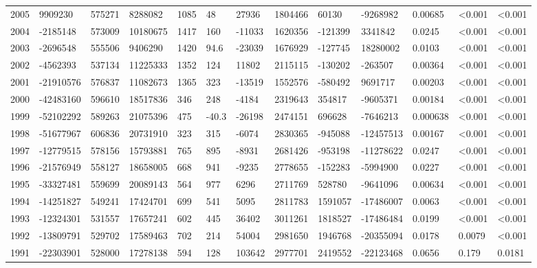 \documentclass{article}
\begin{document}
\begin{table}[H]
\begin{tabular}{rllllllllllll}
  2005 & 9909230 & 575271 & 8288082 & 1085 & 48 & 27936 & 1804466 & 60130 & -9268982 & 0.00685 & \textless 0.001 & \textless 0.001 \\
  2004 & -2185148 & 573009 & 10180675 & 1417 & 160 & -11033 & 1620356 & -121399 & 3341842 & 0.0245 & \textless 0.001 & \textless 0.001 \\
  2003 & -2696548 & 555506 & 9406290 & 1420 & 94.6 & -23039 & 1676929 & -127745 & 18280002 & 0.0103 & \textless 0.001 & \textless 0.001 \\
  2002 & -4562393 & 537134 & 11225333 & 1352 & 124 & 11802 & 2115115 & -130202 & -263507 & 0.00364 & \textless 0.001 & \textless 0.001 \\
  2001 & -21910576 & 576837 & 11082673 & 1365 & 323 & -13519 & 1552576 & -580492 & 9691717 & 0.00203 & \textless 0.001 & \textless 0.001 \\
  2000 & -42483160 & 596610 & 18517836 & 346 & 248 & -4184 & 2319643 & 354817 & -9605371 & 0.00184 & \textless 0.001 & \textless 0.001 \\
  1999 & -52102292 & 589263 & 21075396 & 475 & -40.3 & -26198 & 2474151 & 696628 & -7646213 & 0.000638 & \textless 0.001 & \textless 0.001 \\
  1998 & -51677967 & 606836 & 20731910 & 323 & 315 & -6074 & 2830365 & -945088 & -12457513 & 0.00167 & \textless 0.001 & \textless 0.001 \\
  1997 & -12779515 & 578156 & 15793881 & 765 & 895 & -8931 & 2681426 & -953198 & -11278622 & 0.0247 & \textless 0.001 & \textless 0.001 \\
  1996 & -21576949 & 558127 & 18658005 & 668 & 941 & -9235 & 2778655 & -152283 & -5994900 & 0.0227 & \textless 0.001 & \textless 0.001 \\
  1995 & -33327481 & 559699 & 20089143 & 564 & 977 & 6296 & 2711769 & 528780 & -9641096 & 0.00634 & \textless 0.001 & \textless 0.001 \\
  1994 & -14251827 & 549241 & 17424701 & 699 & 541 & 5095 & 2811783 & 1591057 & -17486007 & 0.0063 & \textless 0.001 & \textless 0.001 \\
  1993 & -12324301 & 531557 & 17657241 & 602 & 445 & 36402 & 3011261 & 1818527 & -17486484 & 0.0199 & \textless 0.001 & \textless 0.001 \\
  1992 & -13809791 & 529702 & 17589463 & 702 & 214 & 54004 & 2981650 & 1946768 & -20355094 & 0.0178 & 0.0079 & \textless 0.001 \\
  1991 & -22303901 & 528000 & 17278138 & 594 & 128 & 103642 & 2977701 & 2419552 & -22123468 & 0.0656 & 0.179 & 0.0181 \\

\end{tabular}
\end{table}
\end{document}
